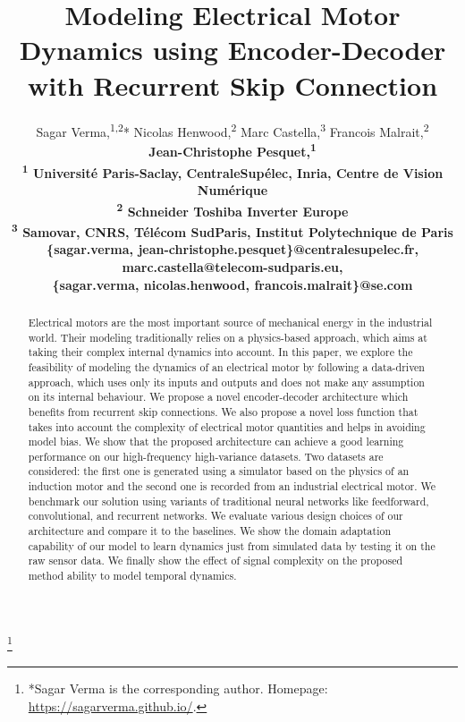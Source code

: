 \documentclass[letterpaper]{article}
\title{Modeling Electrical Motor Dynamics using Encoder-Decoder with Recurrent Skip Connection}
\author{
Sagar Verma,\textsuperscript{\rm 1}\textsuperscript{,}\textsuperscript{\rm 2}*
Nicolas Henwood,\textsuperscript{\rm 2}
Marc Castella,\textsuperscript{\rm 3}
Francois Malrait,\textsuperscript{\rm 2} \\
\bf \Large Jean-Christophe Pesquet,\textsuperscript{\rm 1} \\
\textsuperscript{\rm 1} Universit\'{e} Paris-Saclay, CentraleSup\'{e}lec, Inria, Centre de Vision Num\'{e}rique \\
\textsuperscript{\rm 2} Schneider Toshiba Inverter Europe \\
\textsuperscript{\rm 3} Samovar, CNRS, T\'{e}l\'{e}com SudParis, Institut Polytechnique de Paris\\
\{sagar.verma, jean-christophe.pesquet\}@centralesupelec.fr, marc.castella@telecom-sudparis.eu, \\
\{sagar.verma, nicolas.henwood, francois.malrait\}@se.com}
\begin{document}
\maketitle
\footnote{*Sagar Verma is the corresponding author. Homepage: \url{https://sagarverma.github.io/}.}

\begin{abstract}
Electrical motors are the most important source of mechanical energy in the industrial world. Their modeling traditionally relies on a physics-based approach, which aims at taking their complex internal dynamics into account. In this paper, we explore the feasibility of modeling the dynamics of an electrical motor  by following a data-driven approach, which uses only its inputs and outputs and does not make any assumption on its internal behaviour. We propose a novel encoder-decoder architecture which benefits from recurrent skip connections. We also propose a novel loss function that takes into account the complexity of electrical motor quantities and helps in avoiding model bias. We show that the proposed architecture can achieve a good learning performance on our high-frequency high-variance datasets. Two datasets are considered: the first one is generated using a simulator based on the physics of an induction motor and the second one is recorded from an industrial electrical motor. We benchmark our solution using variants of traditional neural networks like feedforward, convolutional, and recurrent networks. We evaluate various design choices of our architecture and compare it to the baselines. We show the domain adaptation capability of our model to learn dynamics just from simulated data by testing it on the raw sensor data. We finally show the effect of signal complexity on the proposed method ability to model temporal dynamics.
\end{abstract}
\end{document}
